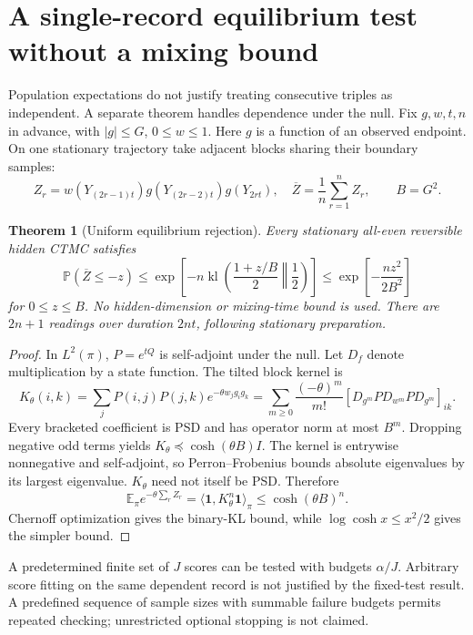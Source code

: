 \documentclass[11pt,a4paper]{article}
\newtheorem{theorem}{Theorem}
\newcommand{\E}{\mathbb E}\newcommand{\Prb}{\mathbb P}
\newcommand{\one}{\mathbf 1}\newcommand{\KL}{D_{\mathrm{KL}}}
\begin{document}
\section{A single-record equilibrium test without a mixing bound}
Population expectations do not justify treating consecutive triples as independent. A separate theorem handles dependence under the null. Fix $g,w,t,n$ in advance, with $|g|\leq G$, $0\leq w\leq1$. Here $g$ is a function of an observed endpoint. On one stationary trajectory take adjacent blocks sharing their boundary samples:
\[
Z_r=w(Y_{(2r-1)t})g(Y_{(2r-2)t})g(Y_{2rt}),\quad
\overline Z=\frac1n\sum_{r=1}^nZ_r,\qquad B=G^2.
\]
\begin{theorem}[Uniform equilibrium rejection]\label{thm:null}
Every stationary all-even reversible hidden CTMC satisfies
\begin{equation}\label{eq:nulltail}
\Prb(\overline Z\leq-z)\leq
\exp\left[-n\operatorname{kl}\left(\frac{1+z/B}{2}\middle\Vert\frac12\right)\right]
\leq\exp\left[-\frac{nz^2}{2B^2}\right]
\end{equation}
for $0\leq z\leq B$. No hidden-dimension or mixing-time bound is used. There are $2n+1$ readings over duration $2nt$, following stationary preparation.
\end{theorem}
\begin{proof}
In $L^2(\pi)$, $P=e^{tQ}$ is self-adjoint under the null. Let $D_f$ denote multiplication by a state function. The tilted block kernel is
\[
K_\theta(i,k)=\sum_jP(i,j)P(j,k)e^{-\theta w_jg_ig_k}
=\sum_{m\geq0}\frac{(-\theta)^m}{m!}
 [D_{g^m}PD_{w^m}PD_{g^m}]_{ik}.
\]
Every bracketed coefficient is PSD and has operator norm at most $B^m$. Dropping negative odd terms yields $K_\theta\preceq\cosh(\theta B)I$. The kernel is entrywise nonnegative and self-adjoint, so Perron--Frobenius bounds absolute eigenvalues by its largest eigenvalue. $K_\theta$ need not itself be PSD. Therefore
\[
\E_\pi e^{-\theta\sum_rZ_r}=\langle\one,K_\theta^n\one\rangle_\pi
\leq\cosh(\theta B)^n.
\]
Chernoff optimization gives the binary-KL bound, while $\log\cosh x\leq x^2/2$ gives the simpler bound.
\end{proof}
A predetermined finite set of $J$ scores can be tested with budgets $\alpha/J$. Arbitrary score fitting on the same dependent record is not justified by the fixed-test result. A predefined sequence of sample sizes with summable failure budgets permits repeated checking; unrestricted optional stopping is not claimed.
\end{document}
